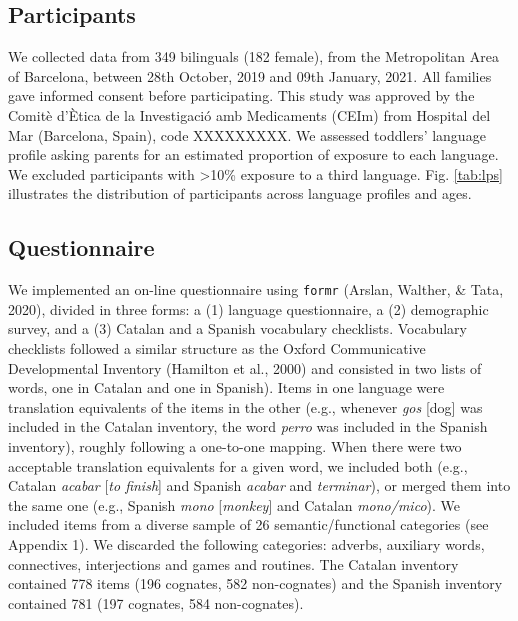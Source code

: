 \documentclass[
  english,
  man,man,floatsintext]{apa6}
\begin{document}
\hypertarget{participants}{%
\subsection{Participants}\label{participants}}

We collected data from 349 bilinguals (182 female), from the Metropolitan Area of Barcelona, between 28th October, 2019 and 09th January, 2021. All families gave informed consent before participating. This study was approved by the Comitè d'Ètica de la Investigació amb Medicaments (CEIm) from Hospital del Mar (Barcelona, Spain), code XXXXXXXXX. We assessed toddlers' language profile asking parents for an estimated proportion of exposure to each language. We excluded participants with \textgreater10\% exposure to a third language. Fig. \ref{tab:lps} illustrates the distribution of participants across language profiles and ages.

\hypertarget{questionnaire}{%
\subsection{Questionnaire}\label{questionnaire}}

We implemented an on-line questionnaire using \texttt{formr} (Arslan, Walther, \& Tata, 2020), divided in three forms: a (1) language questionnaire, a (2) demographic survey, and a (3) Catalan and a Spanish vocabulary checklists. Vocabulary checklists followed a similar structure as the Oxford Communicative Developmental Inventory (Hamilton et al., 2000) and consisted in two lists of words, one in Catalan and one in Spanish). Items in one language were translation equivalents of the items in the other (e.g., whenever \emph{gos} {[}dog{]} was included in the Catalan inventory, the word \emph{perro} was included in the Spanish inventory), roughly following a one-to-one mapping. When there were two acceptable translation equivalents for a given word, we included both (e.g., Catalan \emph{acabar} {[}\emph{to finish}{]} and Spanish \emph{acabar} and \emph{terminar}), or merged them into the same one (e.g., Spanish \emph{mono} {[}\emph{monkey}{]} and Catalan \emph{mono/mico}). We included items from a diverse sample of 26 semantic/functional categories (see Appendix 1). We discarded the following categories: adverbs, auxiliary words, connectives, interjections and games and routines. The Catalan inventory contained 778 items (196 cognates, 582 non-cognates) and the Spanish inventory contained 781 (197 cognates, 584 non-cognates).
\end{document}
